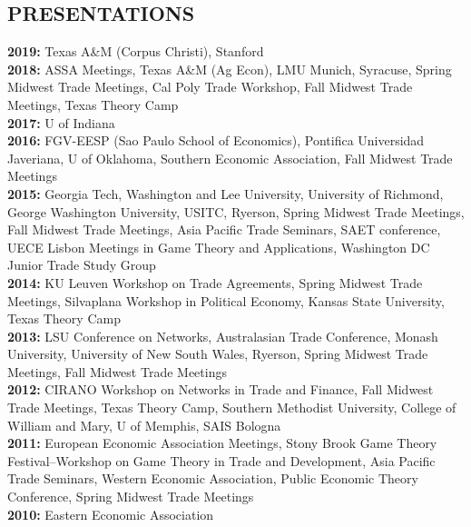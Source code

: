 \documentclass[11pt]{res}
\begin{document}
\begin{resume}
\section{PRESENTATIONS}\vspace{1.5mm}
{\bf 2019:} Texas A\&M (Corpus Christi)\vspace{1.5mm}, Stanford\\
{\bf 2018:} ASSA Meetings, Texas A\&M (Ag Econ), LMU Munich, Syracuse, Spring Midwest Trade Meetings, Cal Poly Trade Workshop, Fall Midwest Trade Meetings, Texas Theory Camp \vspace{1.5mm}\\
{\bf 2017:} U of Indiana \vspace{1.5mm}\\
{\bf 2016:} FGV-EESP (Sao Paulo School of Economics), Pontifica Universidad Javeriana, U of Oklahoma, Southern Economic Association, Fall Midwest Trade Meetings\vspace{1.5mm}\\
{\bf 2015:} Georgia Tech, Washington and Lee University, University of Richmond, George Washington University, USITC, Ryerson, Spring Midwest Trade Meetings, Fall Midwest Trade Meetings, Asia Pacific Trade Seminars, SAET conference, UECE Lisbon Meetings in Game Theory and Applications, Washington DC Junior Trade Study Group\vspace{1.5mm}\\
{\bf 2014:} KU Leuven Workshop on Trade Agreements, Spring Midwest Trade Meetings, Silvaplana Workshop in Political Economy, Kansas State University, Texas Theory Camp\vspace{1.5mm}\\
{\bf 2013:} LSU Conference on Networks, Australasian Trade Conference, Monash University, University of New South Wales, Ryerson, Spring Midwest Trade Meetings, Fall Midwest Trade Meetings \vspace{1.5mm}\\
{\bf 2012:}  CIRANO Workshop on Networks in Trade and Finance, Fall Midwest Trade Meetings, Texas Theory Camp, Southern Methodist University, College of William and Mary, U of Memphis, SAIS Bologna\vspace{1.5mm}\\
{\bf 2011:} European Economic Association Meetings, Stony Brook Game Theory Festival--Workshop on Game Theory in Trade and Development, Asia Pacific Trade Seminars, Western Economic Association, Public Economic Theory Conference, Spring Midwest Trade Meetings\vspace{1.5mm}\\
{\bf 2010:} Eastern Economic Association


\end{resume}
\end{document}
